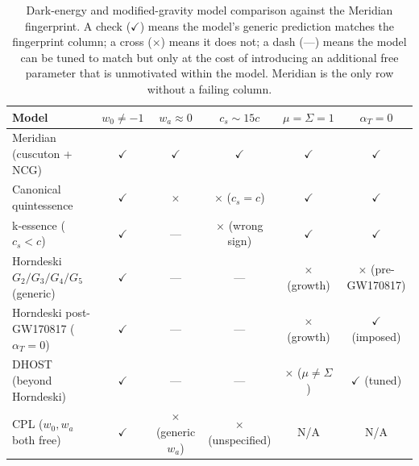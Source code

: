 \begin{table}[h!]
\caption{Dark-energy and modified-gravity model comparison against the Meridian fingerprint. A check ($\checkmark$) means the model's generic prediction matches the fingerprint column; a cross ($\times$) means it does not; a dash (---) means the model can be tuned to match but only at the cost of introducing an additional free parameter that is unmotivated within the model. Meridian is the only row without a failing column.}
\label{tab:de-fingerprint}
\small
\renewcommand{\arraystretch}{1.30}
\begin{tabular}{@{}p{4.2cm}ccccc@{}}
\toprule
\textbf{Model} &
$w_0 \neq -1$ & $w_a \approx 0$ & $c_s \sim 15c$ & $\mu = \Sigma = 1$ & $\alpha_T = 0$ \\
\midrule
Meridian (cuscuton + NCG) &
$\checkmark$ & $\checkmark$ & $\checkmark$ & $\checkmark$ & $\checkmark$ \\[2pt]

Canonical quintessence &
$\checkmark$ & $\times$ & $\times$ ($c_s = c$) & $\checkmark$ & $\checkmark$ \\[2pt]

k-essence ($c_s < c$) &
$\checkmark$ & --- & $\times$ (wrong sign) & $\checkmark$ & $\checkmark$ \\[2pt]

Horndeski $G_2/G_3/G_4/G_5$ (generic) &
$\checkmark$ & --- & --- & $\times$ (growth) & $\times$ (pre-GW170817) \\[2pt]

Horndeski post-GW170817 ($\alpha_T = 0$) &
$\checkmark$ & --- & --- & $\times$ (growth) & $\checkmark$ (imposed) \\[2pt]

DHOST (beyond Horndeski) &
$\checkmark$ & --- & --- & $\times$ ($\mu \neq \Sigma$) & $\checkmark$ (tuned) \\[2pt]

CPL ($w_0, w_a$ both free) &
$\checkmark$ & $\times$ (generic $w_a$) & $\times$ (unspecified) & N/A & N/A \\
\bottomrule
\end{tabular}
\end{table}

